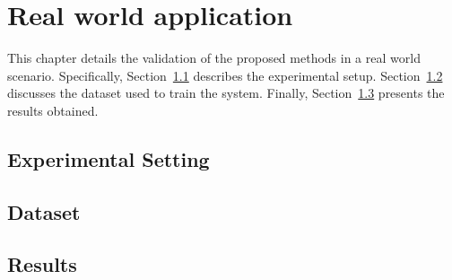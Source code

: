 \chapter{Real world application}
This chapter details the validation of the proposed methods in a real world scenario. Specifically, Section~\ref{sec:real_world_exp_setting} describes the experimental setup. Section~\ref{sec:real_world_dataset} discusses the dataset used to train the system. Finally, Section~\ref{sec:real_results} presents the results obtained.

\section{Experimental Setting}
\label{sec:real_world_exp_setting}

\section{Dataset}
\label{sec:real_world_dataset}

\section{Results}
\label{sec:real_results}
